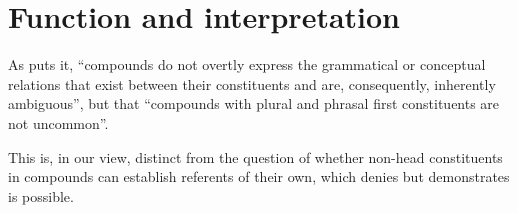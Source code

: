 \section{Function and interpretation}
\label{sec:functionandinterpretation}


As \parencite[365--366]{Olsen2015} puts it, ``compounds do not overtly express the grammatical or conceptual relations that exist between their constituents and are, consequently, inherently ambiguous'', but that ``compounds with plural and phrasal first constituents are not uncommon''.

This is, in our view, distinct from the question of whether non-head constituents in compounds can establish referents of their own, which \textcite[366]{Olsen2015} denies but \textcite{Dressler1987} demonstrates is possible.


